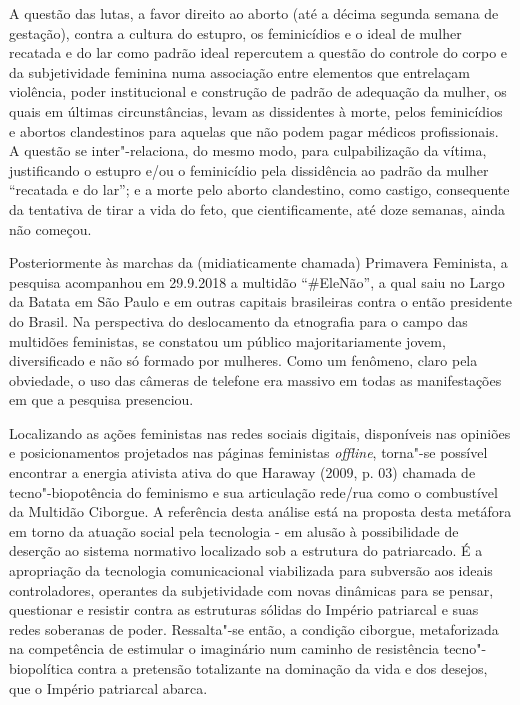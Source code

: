 A questão das lutas, a favor direito ao aborto (até a décima segunda
semana de gestação), contra a cultura do estupro, os feminicídios e o
ideal de mulher recatada e do lar como padrão ideal repercutem a questão
do controle do corpo e da subjetividade feminina numa associação entre
elementos que entrelaçam violência, poder institucional e construção de
padrão de adequação da mulher, os quais em últimas circunstâncias, levam
as dissidentes à morte, pelos feminicídios e abortos clandestinos para
aquelas que não podem pagar médicos profissionais. A questão se
inter"-relaciona, do mesmo modo, para culpabilização da vítima,
justificando o estupro e/ou o feminicídio pela dissidência ao padrão da
mulher ``recatada e do lar''; e a morte pelo aborto clandestino, como
castigo, consequente da tentativa de tirar a vida do feto, que
cientificamente, até doze semanas, ainda não começou.

Posteriormente às marchas da (midiaticamente chamada) Primavera
Feminista, a pesquisa acompanhou em 29.9.2018 a multidão ``\#EleNão'',
a qual saiu no Largo da Batata em São Paulo e em outras capitais
brasileiras contra o então presidente do Brasil. Na perspectiva do
deslocamento da etnografia para o campo das multidões feministas, se
constatou um público majoritariamente jovem, diversificado e não só
formado por mulheres. Como um fenômeno, claro pela obviedade, o uso das
câmeras de telefone era massivo em todas as manifestações em que a
pesquisa presenciou.

Localizando as ações feministas nas redes sociais digitais, disponíveis
nas opiniões e posicionamentos projetados nas páginas feministas
\emph{offline}, torna"-se possível encontrar a energia ativista ativa do que
Haraway (2009, p. 03) chamada de tecno"-biopotência do feminismo e sua
articulação rede/rua como o combustível da Multidão Ciborgue. A
referência desta análise está na proposta desta metáfora em torno da
atuação social pela tecnologia - em alusão à possibilidade de deserção
ao sistema normativo localizado sob a estrutura do patriarcado. É a
apropriação da tecnologia comunicacional viabilizada para subversão aos
ideais controladores, operantes da subjetividade com novas dinâmicas
para se pensar, questionar e resistir contra as estruturas sólidas do
Império patriarcal e suas redes soberanas de poder. Ressalta"-se então, a
condição ciborgue, metaforizada na competência de estimular o imaginário
num caminho de resistência tecno"-biopolítica contra a pretensão
totalizante na dominação da vida e dos desejos, que o Império patriarcal
abarca.

